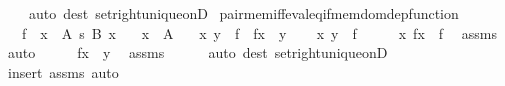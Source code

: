 \begin{isabellebody}
\ \ \ \ {\isacharparenleft}{\kern0pt}auto\ dest{\isacharcolon}{\kern0pt}\ set{\isacharunderscore}{\kern0pt}right{\isacharunderscore}{\kern0pt}unique{\isacharunderscore}{\kern0pt}onD{\isacharparenright}{\kern0pt}\isanewline
{}\isamarkupfalse%
%
\endisatagproof
{\isafoldproof}%
%
\isadelimproof
\isanewline
%
\endisadelimproof
\isanewline
{}\isamarkupfalse%
\ pair{\isacharunderscore}{\kern0pt}mem{\isacharunderscore}{\kern0pt}iff{\isacharunderscore}{\kern0pt}eval{\isacharunderscore}{\kern0pt}eq{\isacharunderscore}{\kern0pt}if{\isacharunderscore}{\kern0pt}mem{\isacharunderscore}{\kern0pt}dom{\isacharunderscore}{\kern0pt}dep{\isacharunderscore}{\kern0pt}function{\isacharcolon}{\kern0pt}\isanewline
\ \ \ {\isachardoublequoteopen}f\ {\isasymin}\ {\isacharparenleft}{\kern0pt}x\ {\isasymin}\ A{\isacharparenright}{\kern0pt}\ {\isasymrightarrow}s\ {\isacharparenleft}{\kern0pt}B\ x{\isacharparenright}{\kern0pt}{\isachardoublequoteclose}\isanewline
\ \ \ {\isachardoublequoteopen}x\ {\isasymin}\ A{\isachardoublequoteclose}\isanewline
\ \ \ {\isachardoublequoteopen}{\isasymlangle}x{\isacharcomma}{\kern0pt}\ y{\isasymrangle}\ {\isasymin}\ f\ {\isasymlongleftrightarrow}\ f{\isacharbackquote}{\kern0pt}x\ {\isacharequal}{\kern0pt}\ y{\isachardoublequoteclose}\isanewline
%
\isadelimproof
%
\endisadelimproof
%
\isatagproof
{}\isamarkupfalse%
\isanewline
\ \ \isamarkupfalse%
\ {\isachardoublequoteopen}{\isasymlangle}x{\isacharcomma}{\kern0pt}\ y{\isasymrangle}\ {\isasymin}\ f{\isachardoublequoteclose}\isanewline
\ \ \isamarkupfalse%
\ \isamarkupfalse%
\ {\isachardoublequoteopen}{\isasymlangle}x{\isacharcomma}{\kern0pt}\ f{\isacharbackquote}{\kern0pt}x{\isasymrangle}\ {\isasymin}\ f{\isachardoublequoteclose}\ \isamarkupfalse%
\ assms\ \isamarkupfalse%
\ auto\isanewline
\ \ \isamarkupfalse%
\ \isamarkupfalse%
\ {\isachardoublequoteopen}f{\isacharbackquote}{\kern0pt}x\ {\isacharequal}{\kern0pt}\ y{\isachardoublequoteclose}\ \isamarkupfalse%
\ assms\isanewline
\ \ \ \ \isamarkupfalse%
\ {\isacharparenleft}{\kern0pt}auto\ dest{\isacharcolon}{\kern0pt}\ set{\isacharunderscore}{\kern0pt}right{\isacharunderscore}{\kern0pt}unique{\isacharunderscore}{\kern0pt}onD{\isacharparenright}{\kern0pt}\isanewline
{}\isamarkupfalse%
\ {\isacharparenleft}{\kern0pt}insert\ assms{\isacharcomma}{\kern0pt}\ auto{\isacharparenright}{\kern0pt}%

\end{isabellebody}
